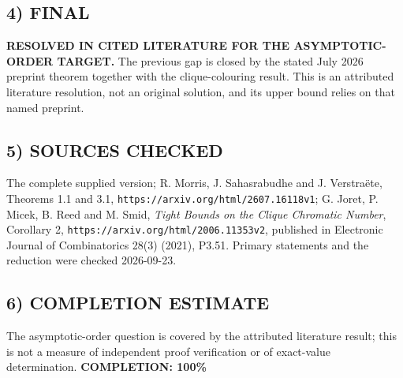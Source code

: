 \subsection*{4) FINAL}
\textbf{RESOLVED IN CITED LITERATURE FOR THE ASYMPTOTIC-ORDER TARGET.} The previous gap is closed by the stated July 2026 preprint theorem together with the clique-colouring result. This is an attributed literature resolution, not an original solution, and its upper bound relies on that named preprint.
\subsection*{5) SOURCES CHECKED}
The complete supplied version; R. Morris, J. Sahasrabudhe and J. Verstra\"ete, Theorems 1.1 and 3.1, \texttt{https://arxiv.org/html/2607.16118v1}; G. Joret, P. Micek, B. Reed and M. Smid, \emph{Tight Bounds on the Clique Chromatic Number}, Corollary 2, \texttt{https://arxiv.org/html/2006.11353v2}, published in Electronic Journal of Combinatorics 28(3) (2021), P3.51. Primary statements and the reduction were checked 2026-09-23.
\subsection*{6) COMPLETION ESTIMATE}
The asymptotic-order question is covered by the attributed literature result; this is not a measure of independent proof verification or of exact-value determination.
\textbf{COMPLETION: 100\%}
